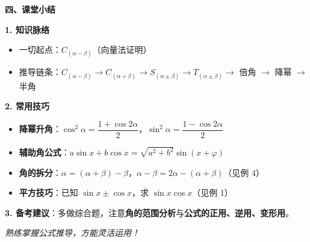 \documentclass[UTF8,10pt,aspectratio=169]{ctexbeamer}
\begin{document}
	\begin{frame}
		\begin{center}
			{\Large \textbf{四、课堂小结}}
		\end{center}
		\vspace{0.4cm}
		
		\textbf{1. 知识脉络}
		\begin{itemize}
			\item 一切起点：$C_{(\alpha-\beta)}$（向量法证明）
			\item 推导链条：$C_{(\alpha-\beta)} \to C_{(\alpha+\beta)} \to S_{(\alpha\pm\beta)} \to T_{(\alpha\pm\beta)} \to$ 倍角 $\to$ 降幂 $\to$ 半角
		\end{itemize}
		
		\vspace{0.3cm}
		\textbf{2. 常用技巧}
		\begin{itemize}
			\item \textbf{降幂升角}：$\cos^2\alpha = \dfrac{1+\cos 2\alpha}{2}$，$\sin^2\alpha = \dfrac{1-\cos 2\alpha}{2}$
			\item \textbf{辅助角公式}：$a\sin x + b\cos x = \sqrt{a^2+b^2}\sin(x+\varphi)$
			\item \textbf{角的拆分}：$\alpha = (\alpha+\beta) - \beta$，$\alpha - \beta = 2\alpha - (\alpha+\beta)$（见例 4）
			\item \textbf{平方技巧}：已知 $\sin x \pm \cos x$，求 $\sin x\cos x$（见例 1）
		\end{itemize}
		
		\vspace{0.3cm}
		\textbf{3. 备考建议}：多做综合题，注意\textbf{角的范围分析}与\textbf{公式的正用、逆用、变形用}。
		
		\vspace{0.4cm}
		\begin{center}
			\textit{熟练掌握公式推导，方能灵活运用！}
		\end{center}
	\end{frame}
	
\end{document}
